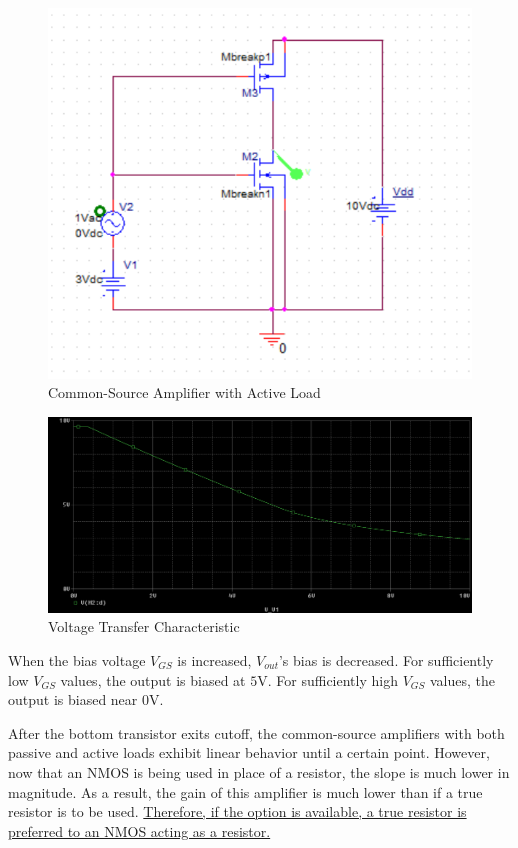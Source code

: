 \FloatBarrier

\begin{figure}[h!]
	\centering
	\includegraphics[scale=0.75]{./images/circuit4.PNG}
	\caption{Common-Source Amplifier with Active Load}
	\label{fig:circuit4}
\end{figure}

\FloatBarrier

\FloatBarrier

\begin{figure}[h!]
	\centering
	\includegraphics[scale=0.50]{./images/dc_sweep.PNG}
	\caption{Voltage Transfer Characteristic}
	\label{fig:dc_sweep}
\end{figure}

\FloatBarrier

When the bias voltage $V_{GS}$ is increased, $V_{out}$'s bias is decreased. For sufficiently low $V_{GS}$ values, the output is biased at $5$\si{\volt}. For sufficiently high $V_{GS}$ values, the output is biased near $0$\si{\volt}.

After the bottom transistor exits cutoff, the common-source amplifiers with both passive and active loads exhibit linear behavior until a certain point. However, now that an NMOS is being used in place of a resistor, the slope is much lower in magnitude. As a result, the gain of this amplifier is much lower than if a true resistor is to be used. \uline{Therefore, if the option is available, a true resistor is preferred to an NMOS acting as a resistor.}
